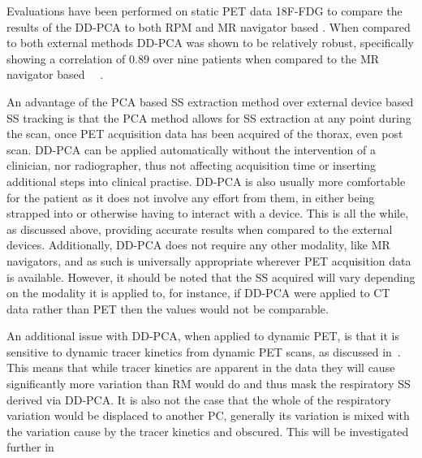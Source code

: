                 Evaluations have been performed on static PET data \gls{18F-FDG} to compare the results of the \gls{DD-PCA} to both \gls{RPM} and \gls{MR} navigator based . When compared to both external methods \gls{DD-PCA} was shown to be relatively robust, specifically showing a correlation of $0.89$ over nine patients when compared to the \gls{MR} navigator based ~~.
                
                An advantage of the \gls{PCA} based \gls{SS} extraction method over external device based \gls{SS} tracking is that the \gls{PCA} method allows for \gls{SS} extraction at any point during the scan, once \gls{PET} acquisition data has been acquired of the thorax, even post scan. \gls{DD-PCA} can be applied automatically without the intervention of a clinician, nor radiographer, thus not affecting acquisition time or inserting additional steps into clinical practise. \gls{DD-PCA} is also usually more comfortable for the patient as it does not involve any effort from them, in either being strapped into or otherwise having to interact with a device. This is all the while, as discussed above, providing accurate results when compared to the external devices. Additionally, \gls{DD-PCA} does not require any other modality, like \gls{MR} navigators, and as such is universally appropriate wherever \gls{PET} acquisition data is available. However, it should be noted that the \gls{SS} acquired will vary depending on the modality it is applied to, for instance, if \gls{DD-PCA} were applied to \gls{CT} data rather than \gls{PET} then the values would not be comparable.
                
                An additional issue with \gls{DD-PCA}, when applied to dynamic \gls{PET}, is that it is sensitive to dynamic tracer kinetics from dynamic \gls{PET} scans, as discussed in~. This means that while tracer kinetics are apparent in the data they will cause significantly more variation than \gls{RM} would do and thus mask the respiratory \gls{SS} derived via \gls{DD-PCA}. It is also not the case that the whole of the respiratory variation would be displaced to another \gls{PC}, generally its variation is mixed with the variation cause by the tracer kinetics and obscured. This will be investigated further in~
        
